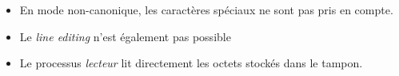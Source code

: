 \begin{frame}
	\begin{itemize}[<+->]
		\item En mode non-canonique, les caractères spéciaux ne sont pas pris en compte.
		
		\item Le \textit{line editing} n'est également pas possible

		\item Le processus \textit{lecteur} lit directement les octets stockés dans le tampon.
	\end{itemize}
\end{frame}
